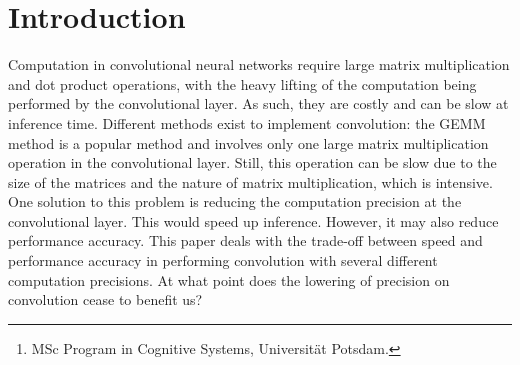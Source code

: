 \documentclass[12pt]{article}
\title{\doctitle}
\author{C. Clayton Violand\footnote{MSc Program in Cognitive Systems, Universit\"at Potsdam.}}
\begin{document}
\maketitle










\begin{abstract}
It is well-known in principle that the full precision of computer hardware (e.g. 32 or 64 bit floats) is not really needed for neural networks. By design they have to be robust against small perturbations in the data and also the activations of units in higher layers (i.e. dropout). Thus, there is a recent trend of people moving to low-precision calculations in order to speed up inference in deep neural networks. In fact, the new nVidia GPUs coming out at the end of this year will feature an 8-bit integer mode specifically for inference in deep Neural Networks, which in theory runs 4x as fast as single precision floats. However, there are few studies on when exactly low precision is enough and how much speed this can bring. This thesis deals with the implementation of neural networks with different computing precisions, and how well they still work depending on the Neural Network architecture. It also explores the gain in speed obtainable on different architectures.
\end{abstract}

\section{Introduction}
Computation in convolutional neural networks require large matrix multiplication and dot product operations, with the heavy lifting of the computation being performed by the convolutional layer. As such, they are costly and can be slow at inference time. Different methods exist to implement convolution: the GEMM method is a popular method and involves only one large matrix multiplication operation in the convolutional layer. Still, this operation can be slow due to the size of the matrices and the nature of matrix multiplication, which is intensive. 
One solution to this problem is reducing the computation precision at the convolutional layer. This would speed up inference. However, it may also reduce performance accuracy. This paper deals with the trade-off between speed and performance accuracy in performing convolution with several different computation precisions. At what point does the lowering of precision on convolution cease to benefit us?
\end{document}
